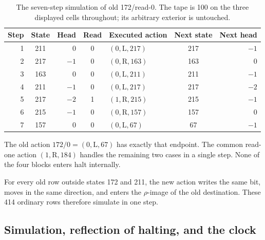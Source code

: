 \documentclass[11pt,letterpaper]{article}
\newcommand{\act}[3]{(#1,\mathrm{#2},#3)}
\begin{document}
\begin{table}[ht]
\centering
\begin{tabular}{@{}rcrclcr@{}}
\toprule
Step & State & Head & Read & Executed action & Next state & Next head\\
\midrule
1 & 211 & 0 & 0 & \(\act{0}{L}{217}\) & 217 & $-1$\\
2 & 217 & $-1$ & 0 & \(\act{0}{R}{163}\) & 163 & 0\\
3 & 163 & 0 & 0 & \(\act{0}{L}{211}\) & 211 & $-1$\\
4 & 211 & $-1$ & 0 & \(\act{0}{L}{217}\) & 217 & $-2$\\
5 & 217 & $-2$ & 1 & \(\act{1}{R}{215}\) & 215 & $-1$\\
6 & 215 & $-1$ & 0 & \(\act{0}{R}{157}\) & 157 & 0\\
7 & 157 & 0 & 0 & \(\act{0}{L}{67}\) & 67 & $-1$\\
\bottomrule
\end{tabular}
\caption{The seven-step simulation of old 172/read-0. The tape is 100 on
the three displayed cells throughout; its arbitrary exterior is untouched.}
\label{tab:seven}
\end{table}

The old action \(172/0=\act{0}{L}{67}\) has exactly that endpoint.
The common read-one action \(\act{1}{R}{184}\) handles the remaining
two cases in a single step. None of the four blocks enters halt internally.

For every old row outside states 172 and 211, the new action writes the
same bit, moves in the same direction, and enters the \(\rho\)-image of
the old destination. These 414 ordinary rows therefore simulate in one step.

\subsection{Simulation, reflection of halting, and the clock}
\end{document}
